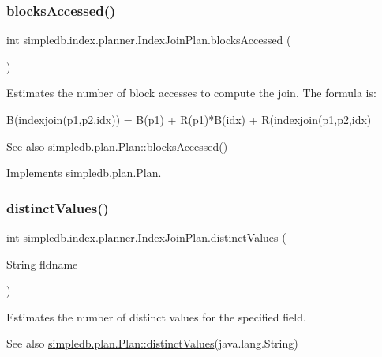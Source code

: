 \subsubsection{\texorpdfstring{blocks\+Accessed()}{blocksAccessed()}}
{\footnotesize\ttfamily int simpledb.\+index.\+planner.\+Index\+Join\+Plan.\+blocks\+Accessed (\begin{DoxyParamCaption}{ }\end{DoxyParamCaption})\hspace{0.3cm}{\ttfamily [inline]}}

Estimates the number of block accesses to compute the join. The formula is\+: 
\begin{DoxyPre} B(indexjoin(p1,p2,idx)) = B(p1) + R(p1)*B(idx)
      + R(indexjoin(p1,p2,idx) \end{DoxyPre}
 \begin{DoxySeeAlso}{See also}
\hyperlink{interfacesimpledb_1_1plan_1_1Plan_a6a333b95b956fe224812155b9d1c8202}{simpledb.\+plan.\+Plan\+::blocks\+Accessed()} 
\end{DoxySeeAlso}


Implements \hyperlink{interfacesimpledb_1_1plan_1_1Plan_a6a333b95b956fe224812155b9d1c8202}{simpledb.\+plan.\+Plan}.

\mbox{\label{classsimpledb_1_1index_1_1planner_1_1IndexJoinPlan_a91f22c04a47d5bc2385eeadd9b270ac5}} 
\subsubsection{\texorpdfstring{distinct\+Values()}{distinctValues()}}
{\footnotesize\ttfamily int simpledb.\+index.\+planner.\+Index\+Join\+Plan.\+distinct\+Values (\begin{DoxyParamCaption}\item[{String}]{fldname }\end{DoxyParamCaption})\hspace{0.3cm}{\ttfamily [inline]}}

Estimates the number of distinct values for the specified field. \begin{DoxySeeAlso}{See also}
\hyperlink{interfacesimpledb_1_1plan_1_1Plan_a55094c16c756b0c09b5c71b94d573271}{simpledb.\+plan.\+Plan\+::distinct\+Values}(java.\+lang.\+String) 
\end{DoxySeeAlso}


